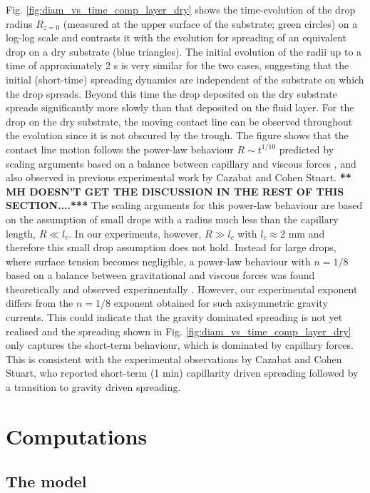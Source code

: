 \documentclass[aip,graphicx]{revtex4-1}
\begin{document}
Fig. \ref{fig:diam_vs_time_comp_layer_dry} shows the time-evolution
of the drop radius $R_{z=0}$ (measured at the upper surface
of the substrate; green circles) on a log-log scale and
contrasts it with the evolution for spreading of an equivalent drop 
on a dry substrate (blue triangles). The initial evolution 
of the radii up to a time of approximately 2 s is very similar for the two 
cases, suggesting that the initial (short-time) spreading dynamics are
independent of the substrate on which the drop spreads.
Beyond this time the drop deposited on the dry substrate spreads
significantly more slowly than that deposited on the fluid layer.
For the drop on the dry substrate, the moving contact line can be
observed throughout the evolution since it is not obscured by the
trough. The figure shows that the contact line motion follows
the power-law behaviour $R \sim t^{1/10}$ predicted by scaling
arguments based on a balance between capillary and viscous forces
\cite{tanner1979spreading}, and also observed in previous experimental
work by Cazabat and Cohen Stuart\cite{cazabat1986dynamics}.
{\bf *** MH DOESN'T GET THE DISCUSSION IN THE REST OF THIS SECTION....***}
The scaling arguments for this power-law behaviour are based
on the assumption of small drops with a radius much less
than the capillary length, $R \ll l_c$.
In our experiments, however, $R \gg l_c$ with $l_c \approx 2$ mm and
therefore this small drop assumption does not hold.
Instead for large drops, where surface tension becomes negligible, a power-law behaviour with $n=1/8$ based on a
balance between gravitational and viscous forces was found
theoretically \cite{lopez1976spreading} and observed experimentally
\cite{cazabat1986dynamics,huppert1982propagation}.
However, our
experimental exponent differs from the $n=1/8$ exponent obtained for
such axisymmetric gravity currents.
This could indicate that the gravity dominated spreading is not yet
realised and the spreading shown in Fig.
\ref{fig:diam_vs_time_comp_layer_dry} only captures the short-term
behaviour, which is dominated by capillary forces.
This is consistent with the experimental observations by Cazabat and
Cohen Stuart\cite{cazabat1986dynamics}, who reported short-term (1
min) capillarity driven spreading followed by a transition to 
gravity driven spreading.


\section{Computations}

\subsection{The model}
\end{document}
